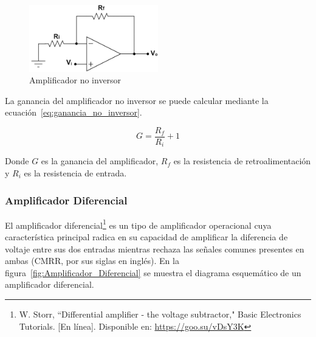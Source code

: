             \begin{figure}[H]
                \centering
                \includegraphics[width=0.5\textwidth]{img/Marco/Amplificador_No_Inversor.png}
                \caption[Amplificador no inversor]{Amplificador no inversor\footnotemark}
                \label{fig:Amplificador_No_Inversor}
            \end{figure}

            La ganancia del amplificador no inversor se puede calcular mediante la ecuación~\ref{eq:ganancia_no_inversor}.

            \begin{equation}
                \label{eq:ganancia_no_inversor}
                G = \frac{R_f}{R_i} + 1
            \end{equation}

            Donde $G$ es la ganancia del amplificador, $R_f$ es la resistencia de retroalimentación y $R_i$ es la resistencia de entrada.

        \subsubsection{Amplificador Diferencial}
            El amplificador diferencial\footnote{W. Storr, ``Differential amplifier - the voltage subtractor," Basic Electronics Tutorials. [En línea]. Disponible en: \url{https://goo.su/vDsY3K}} es un tipo de amplificador operacional cuya característica principal radica en su capacidad de amplificar la diferencia de voltaje entre sus dos entradas mientras rechaza las señales comunes presentes en ambas (CMRR, por sus siglas en inglés). En la figura~\ref{fig:Amplificador_Diferencial} se muestra el diagrama esquemático de un amplificador diferencial.

